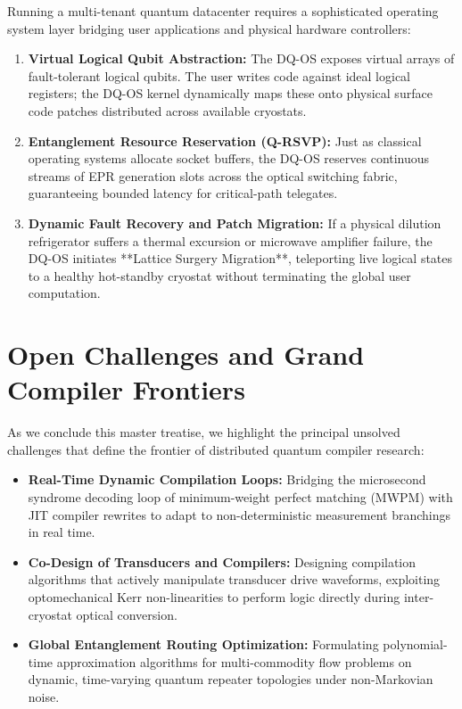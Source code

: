 Running a multi-tenant quantum datacenter requires a sophisticated operating system layer bridging user applications and physical hardware controllers:
\begin{enumerate}
    \item \textbf{Virtual Logical Qubit Abstraction:} The DQ-OS exposes virtual arrays of fault-tolerant logical qubits. The user writes code against ideal logical registers; the DQ-OS kernel dynamically maps these onto physical surface code patches distributed across available cryostats.
    \item \textbf{Entanglement Resource Reservation (Q-RSVP):} Just as classical operating systems allocate socket buffers, the DQ-OS reserves continuous streams of EPR generation slots across the optical switching fabric, guaranteeing bounded latency for critical-path telegates.
    \item \textbf{Dynamic Fault Recovery and Patch Migration:} If a physical dilution refrigerator suffers a thermal excursion or microwave amplifier failure, the DQ-OS initiates **Lattice Surgery Migration**, teleporting live logical states to a healthy hot-standby cryostat without terminating the global user computation.
\end{enumerate}

\section{Open Challenges and Grand Compiler Frontiers}
\label{sec:open_challenges}

As we conclude this master treatise, we highlight the principal unsolved challenges that define the frontier of distributed quantum compiler research:
\begin{itemize}
    \item \textbf{Real-Time Dynamic Compilation Loops:} Bridging the microsecond syndrome decoding loop of minimum-weight perfect matching (MWPM) with JIT compiler rewrites to adapt to non-deterministic measurement branchings in real time.
    \item \textbf{Co-Design of Transducers and Compilers:} Designing compilation algorithms that actively manipulate transducer drive waveforms, exploiting optomechanical Kerr non-linearities to perform logic directly during inter-cryostat optical conversion.
    \item \textbf{Global Entanglement Routing Optimization:} Formulating polynomial-time approximation algorithms for multi-commodity flow problems on dynamic, time-varying quantum repeater topologies under non-Markovian noise.
\end{itemize}


